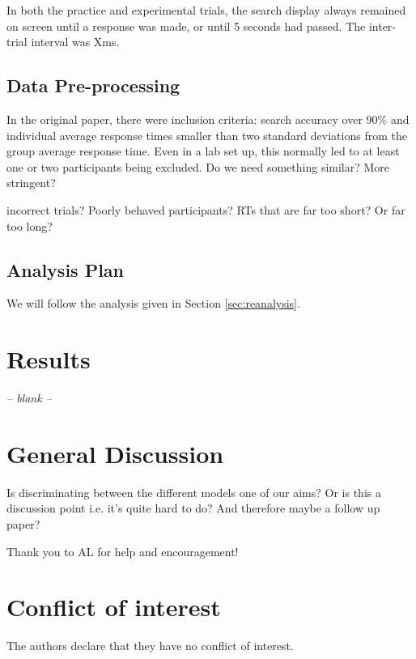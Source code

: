 \documentclass[smallextended, natbib]{svjour3}       %
\begin{document}
In both the practice and experimental trials, the search display always remained on screen until a response was made, or until 5 seconds had passed. The inter-trial interval was Xms.

\subsection{Data Pre-processing}

In the original paper, there were inclusion criteria: search accuracy over 90\% and individual average response times smaller than two standard deviations from the group average response time. Even in a lab set up, this normally led to at least one or two participants being excluded. Do we need something similar? More stringent?

incorrect trials? Poorly behaved participants? RTs that are far too short? Or far too long?

\subsection{Analysis Plan}

We will follow the analysis given in Section \ref{sec:reanalysis}.


\section{Results}
\begin{center}
\textit{-- blank --}
\end{center}


\section{General Discussion}

Is discriminating between the different models one of our aims? Or is this a discussion point i.e. it's quite hard to do? And therefore maybe a follow up paper?


\begin{acknowledgements}
Thank you to AL for help and encouragement! 
\end{acknowledgements}

%
\section*{Conflict of interest}
The authors declare that they have no conflict of interest.

\end{document}
